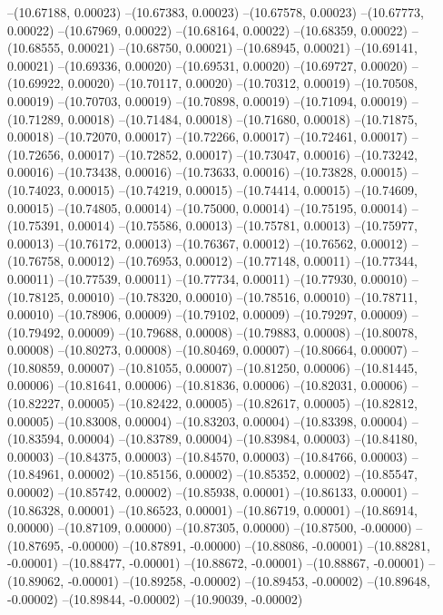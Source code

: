 --(10.67188, 0.00023)
--(10.67383, 0.00023)
--(10.67578, 0.00023)
--(10.67773, 0.00022)
--(10.67969, 0.00022)
--(10.68164, 0.00022)
--(10.68359, 0.00022)
--(10.68555, 0.00021)
--(10.68750, 0.00021)
--(10.68945, 0.00021)
--(10.69141, 0.00021)
--(10.69336, 0.00020)
--(10.69531, 0.00020)
--(10.69727, 0.00020)
--(10.69922, 0.00020)
--(10.70117, 0.00020)
--(10.70312, 0.00019)
--(10.70508, 0.00019)
--(10.70703, 0.00019)
--(10.70898, 0.00019)
--(10.71094, 0.00019)
--(10.71289, 0.00018)
--(10.71484, 0.00018)
--(10.71680, 0.00018)
--(10.71875, 0.00018)
--(10.72070, 0.00017)
--(10.72266, 0.00017)
--(10.72461, 0.00017)
--(10.72656, 0.00017)
--(10.72852, 0.00017)
--(10.73047, 0.00016)
--(10.73242, 0.00016)
--(10.73438, 0.00016)
--(10.73633, 0.00016)
--(10.73828, 0.00015)
--(10.74023, 0.00015)
--(10.74219, 0.00015)
--(10.74414, 0.00015)
--(10.74609, 0.00015)
--(10.74805, 0.00014)
--(10.75000, 0.00014)
--(10.75195, 0.00014)
--(10.75391, 0.00014)
--(10.75586, 0.00013)
--(10.75781, 0.00013)
--(10.75977, 0.00013)
--(10.76172, 0.00013)
--(10.76367, 0.00012)
--(10.76562, 0.00012)
--(10.76758, 0.00012)
--(10.76953, 0.00012)
--(10.77148, 0.00011)
--(10.77344, 0.00011)
--(10.77539, 0.00011)
--(10.77734, 0.00011)
--(10.77930, 0.00010)
--(10.78125, 0.00010)
--(10.78320, 0.00010)
--(10.78516, 0.00010)
--(10.78711, 0.00010)
--(10.78906, 0.00009)
--(10.79102, 0.00009)
--(10.79297, 0.00009)
--(10.79492, 0.00009)
--(10.79688, 0.00008)
--(10.79883, 0.00008)
--(10.80078, 0.00008)
--(10.80273, 0.00008)
--(10.80469, 0.00007)
--(10.80664, 0.00007)
--(10.80859, 0.00007)
--(10.81055, 0.00007)
--(10.81250, 0.00006)
--(10.81445, 0.00006)
--(10.81641, 0.00006)
--(10.81836, 0.00006)
--(10.82031, 0.00006)
--(10.82227, 0.00005)
--(10.82422, 0.00005)
--(10.82617, 0.00005)
--(10.82812, 0.00005)
--(10.83008, 0.00004)
--(10.83203, 0.00004)
--(10.83398, 0.00004)
--(10.83594, 0.00004)
--(10.83789, 0.00004)
--(10.83984, 0.00003)
--(10.84180, 0.00003)
--(10.84375, 0.00003)
--(10.84570, 0.00003)
--(10.84766, 0.00003)
--(10.84961, 0.00002)
--(10.85156, 0.00002)
--(10.85352, 0.00002)
--(10.85547, 0.00002)
--(10.85742, 0.00002)
--(10.85938, 0.00001)
--(10.86133, 0.00001)
--(10.86328, 0.00001)
--(10.86523, 0.00001)
--(10.86719, 0.00001)
--(10.86914, 0.00000)
--(10.87109, 0.00000)
--(10.87305, 0.00000)
--(10.87500, -0.00000)
--(10.87695, -0.00000)
--(10.87891, -0.00000)
--(10.88086, -0.00001)
--(10.88281, -0.00001)
--(10.88477, -0.00001)
--(10.88672, -0.00001)
--(10.88867, -0.00001)
--(10.89062, -0.00001)
--(10.89258, -0.00002)
--(10.89453, -0.00002)
--(10.89648, -0.00002)
--(10.89844, -0.00002)
--(10.90039, -0.00002)
